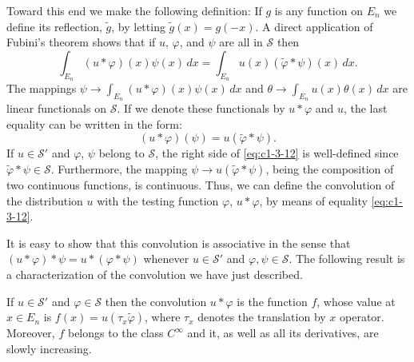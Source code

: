 Toward this end we make the following definition: If $g$ is any function on
$E_{n}$ we define its reflection, $\tilde{g}$, by letting
$\tilde{g}(x) = g(-x)$. A direct application of Fubini's theorem shows that if
$u$, $\varphi$, and $\psi$ are all in $\mathscr{S}$ then
\[
\int_{E_{n}}(u*\varphi)(x)\psi(x)\,dx=\int_{E_{n}}u(x)(\tilde{\varphi}*\psi)(x)\,dx.
\]
The mappings $\psi \to \int_{E_{n}}(u * \varphi)(x) \psi(x) \, dx$ and
$\theta \to \int_{E_{n}} u(x) \theta(x) \, dx$ are linear functionals on
$\mathscr{S}$. If we denote these functionals by $u * \varphi$ and $u$, the
last equality can be written in the form:
\begin{equation}\label{eq:c1-3-12}
(u*\varphi)(\psi)=u(\tilde{\varphi}*\psi).
\end{equation}
If $u \in \mathscr{S}'$ and $\varphi$, $\psi$ belong to $\mathscr{S}$, the
right side of \eqref{eq:c1-3-12} is well-defined since
$\tilde{\varphi} * \psi \in \mathscr{S}$. Furthermore, the mapping
$\psi \to u(\tilde{\varphi} * \psi)$, being the composition of two continuous
functions, is continuous. Thus, we can define the convolution of the
distribution $u$ with the testing function $\varphi$, $u * \varphi$, by means
of equality \eqref{eq:c1-3-12}.

It is easy to show that this convolution is associative in the sense that
$(u * \varphi) * \psi = u * (\varphi * \psi)$ whenever $u \in \mathscr{S}'$
and $\varphi, \psi \in \mathscr{S}$. The following result is a
characterization of the convolution we have just described.

\begin{theorem}\label{thm:c1-3-13}
If $u \in \mathscr{S}'$ and $\varphi \in \mathscr{S}$ then the convolution
$u * \varphi$ is the function $f$, whose value at $x \in E_{n}$ is
$f(x) = u(\tau_{x}\tilde{\varphi})$, where $\tau_{x}$ denotes the translation
by $x$ operator. Moreover, $f$ belongs to the class $C^{\infty}$ and it, as
well as all its derivatives, are slowly increasing.
\end{theorem}

